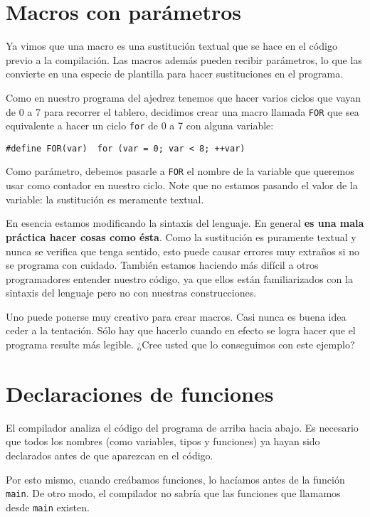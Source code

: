 \section{Macros con parámetros}

Ya vimos que una macro es una sustitución textual que se hace en el
código previo a la compilación. Las macros además pueden recibir
parámetros, lo que las convierte en una especie de plantilla para hacer
sustituciones en el programa.

Como en nuestro programa del ajedrez tenemos que hacer varios ciclos que
vayan de 0 a 7 para recorrer el tablero, decidimos crear una macro
llamada \lstinline!FOR! que sea equivalente a hacer un ciclo
\lstinline!for! de 0 a 7 con alguna variable:

\begin{lstlisting}
#define FOR(var)  for (var = 0; var < 8; ++var)
\end{lstlisting}

Como parámetro, debemos pasarle a \lstinline!FOR! el nombre de la
variable que queremos usar como contador en nuestro ciclo. Note que no
estamos pasando el valor de la variable: la sustitución es meramente
textual.

En esencia estamos modificando la sintaxis del lenguaje. En general
\textbf{es una mala práctica hacer cosas como ésta}. Como la sustitución
es puramente textual y nunca se verifica que tenga sentido, esto puede
causar errores muy extraños si no se programa con cuidado. También
estamos haciendo más difícil a otros programadores entender nuestro
código, ya que ellos están familiarizados con la sintaxis del lenguaje
pero no con nuestras construcciones.

Uno puede ponerse muy creativo para crear macros. Casi nunca es buena
idea ceder a la tentación. Sólo hay que hacerlo cuando en efecto se
logra hacer que el programa resulte más legible. ¿Cree usted que lo
conseguimos con este ejemplo?

\section{Declaraciones de funciones}

El compilador analiza el código del programa de arriba hacia abajo. Es
necesario que todos los nombres (como variables, tipos y funciones) ya
hayan sido declarados antes de que aparezcan en el código.

Por esto mismo, cuando creábamos funciones, lo hacíamos antes de la
función \lstinline!main!. De otro modo, el compilador no sabría que las
funciones que llamamos desde \lstinline!main! existen.


